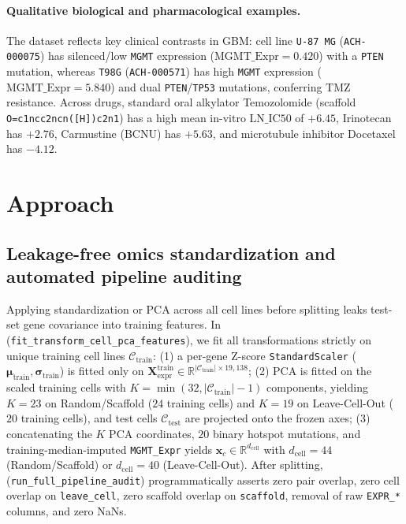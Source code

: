 \documentclass{article}
\begin{document}
\paragraph{Qualitative biological and pharmacological examples.}
The dataset reflects key clinical contrasts in GBM: cell line \texttt{U-87 MG} (\texttt{ACH-000075}) has silenced/low \texttt{MGMT} expression ($\text{MGMT\_Expr} = 0.420$) with a \texttt{PTEN} mutation, whereas \texttt{T98G} (\texttt{ACH-000571}) has high \texttt{MGMT} expression ($\text{MGMT\_Expr} = 5.840$) and dual \texttt{PTEN}/\texttt{TP53} mutations, conferring TMZ resistance. Across drugs, standard oral alkylator Temozolomide (scaffold \texttt{O=c1ncc2ncn([H])c2n1}) has a high mean in-vitro $\text{LN\_IC50}$ of $+6.45$, Irinotecan has $+2.76$, Carmustine (BCNU) has $+5.63$, and microtubule inhibitor Docetaxel has $-4.12$.

\section{Approach}
\label{sec:approach}

\subsection{Leakage-free omics standardization and automated pipeline auditing}
Applying standardization or PCA across all cell lines before splitting leaks test-set gene covariance into training features. In  (\texttt{fit\_transform\_cell\_pca\_features}), we fit all transformations strictly on unique training cell lines $\mathcal{C}_{\text{train}}$:
(1) a per-gene Z-score \texttt{StandardScaler} ($\boldsymbol{\mu}_{\text{train}}, \boldsymbol{\sigma}_{\text{train}}$) is fitted only on $\mathbf{X}_{\text{expr}}^{\text{train}} \in \mathbb{R}^{|\mathcal{C}_{\text{train}}| \times 19,138}$;
(2) PCA is fitted on the scaled training cells with $K = \min(32, |\mathcal{C}_{\text{train}}| - 1)$ components, yielding $K = 23$ on Random/Scaffold ($24$ training cells) and $K = 19$ on Leave-Cell-Out ($20$ training cells), and test cells $\mathcal{C}_{\text{test}}$ are projected onto the frozen axes;
(3) concatenating the $K$ PCA coordinates, $20$ binary hotspot mutations, and training-median-imputed \texttt{MGMT\_Expr} yields $\mathbf{x}_c \in \mathbb{R}^{d_{\text{cell}}}$ with $d_{\text{cell}} = 44$ (Random/Scaffold) or $d_{\text{cell}} = 40$ (Leave-Cell-Out).
After splitting,  (\texttt{run\_full\_pipeline\_audit}) programmatically asserts zero pair overlap, zero cell overlap on \texttt{leave\_cell}, zero scaffold overlap on \texttt{scaffold}, removal of raw \texttt{EXPR\_*} columns, and zero NaNs.
\end{document}
